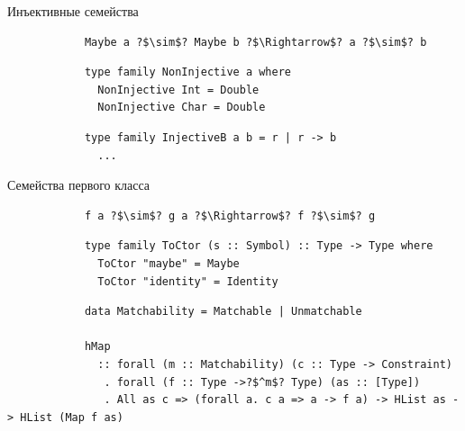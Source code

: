     \begin{frame}[fragile]{Инъективные семейства}
        \pause
        \begin{verbatim}
            Maybe a ?$\sim$? Maybe b ?$\Rightarrow$? a ?$\sim$? b
        \end{verbatim}
        \pause\vspace{1em}
        \begin{verbatim}
            type family NonInjective a where
              NonInjective Int = Double
              NonInjective Char = Double
        \end{verbatim}
        \pause\vspace{1em}
        \begin{verbatim}
            type family InjectiveB a b = r | r -> b
              ...
        \end{verbatim}
    \end{frame}

    \begin{frame}[fragile]{Семейства первого класса}
        \pause
        \begin{verbatim}
            f a ?$\sim$? g a ?$\Rightarrow$? f ?$\sim$? g
        \end{verbatim}
        \pause\vspace{1em}
        \begin{verbatim}
            type family ToCtor (s :: Symbol) :: Type -> Type where
              ToCtor "maybe" = Maybe
              ToCtor "identity" = Identity
        \end{verbatim}
        \pause\vspace{1em}
        \begin{verbatim}
            data Matchability = Matchable | Unmatchable

            hMap
              :: forall (m :: Matchability) (c :: Type -> Constraint)
               . forall (f :: Type ->?$^m$? Type) (as :: [Type])
               . All as c => (forall a. c a => a -> f a) -> HList as -> HList (Map f as)
        \end{verbatim}
    \end{frame}



